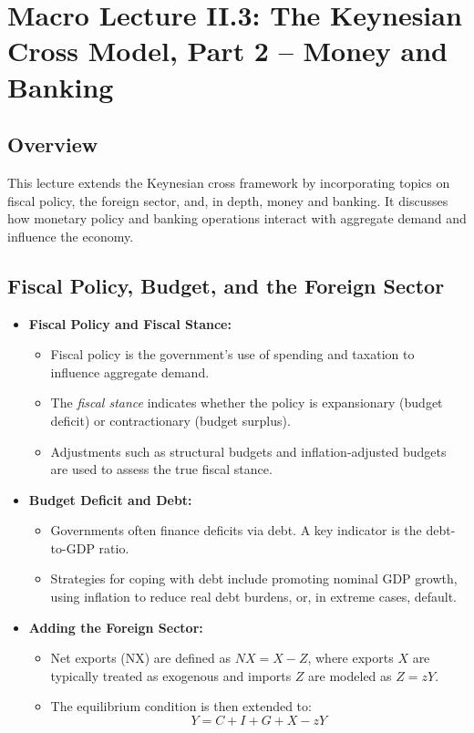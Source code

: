 \chapter*{Macro Lecture II.3: The Keynesian Cross Model, Part 2 -- Money and Banking}
\section*{Overview}
This lecture extends the Keynesian cross framework by incorporating topics on fiscal policy, the foreign sector, and, in depth, money and banking. It discusses how monetary policy and banking operations interact with aggregate demand and influence the economy.

\section*{Fiscal Policy, Budget, and the Foreign Sector}
\begin{itemize}
    \item \textbf{Fiscal Policy and Fiscal Stance:} 
    \begin{itemize}
        \item Fiscal policy is the government’s use of spending and taxation to influence aggregate demand.
        \item The \emph{fiscal stance} indicates whether the policy is expansionary (budget deficit) or contractionary (budget surplus).
        \item Adjustments such as structural budgets and inflation-adjusted budgets are used to assess the true fiscal stance.
    \end{itemize}
    \item \textbf{Budget Deficit and Debt:}
    \begin{itemize}
        \item Governments often finance deficits via debt. A key indicator is the debt-to-GDP ratio.
        \item Strategies for coping with debt include promoting nominal GDP growth, using inflation to reduce real debt burdens, or, in extreme cases, default.
    \end{itemize}
    \item \textbf{Adding the Foreign Sector:}
    \begin{itemize}
        \item Net exports (NX) are defined as \(NX = X - Z\), where exports \(X\) are typically treated as exogenous and imports \(Z\) are modeled as \(Z = zY\).
        \item The equilibrium condition is then extended to:
        \[
        Y = C + I + G + X - zY
        \]
    \end{itemize}
\end{itemize}

